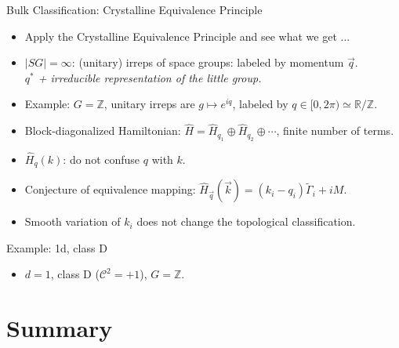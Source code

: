 \documentclass[xcolor=table, 11pt, aspectratio=169]{beamer}
\begin{document}
  \begin{frame}{Bulk Classification: Crystalline Equivalence Principle}
    \begin{itemize}
      \item<1-> Apply the Crystalline Equivalence Principle and see what we get ...
      \item<2-> $|SG|=\infty$: (unitary) irreps of space groups: labeled by momentum $\vec q$.\\
      \emph{$q^\ast$ + irreducible representation of the little group.}
      \item<3-> Example: $G=\mathbb Z$, unitary irreps are $g\mapsto e^{iq}$, labeled by $q\in [0,2\pi)\simeq\mathbb R/\mathbb Z$.
      \item<4-> Block-diagonalized Hamiltonian: $\hat H=\hat H_{q_1}\oplus\hat H_{q_2}\oplus\cdots$, \alert{finite} number of terms.
      \item<5-> $\hat H_q(k)$: do not confuse $q$ with $k$.
      \item<6-> Conjecture of equivalence mapping: $\hat H_{\vec q}(\vec k)=(k_i-q_i)\tilde\Gamma_i+iM$.
      \item<7-> Smooth variation of $k_i$ does not change the topological classification.
    \end{itemize}
    \begin{center}
    \begin{animateinline}{30}
      \multiframe{100}{Ra=1.5+-0.01}{
      \begin{tikzpicture}[scale=2]
          \draw [->] (0, 0) -- (2, 0) node [right] {$k$};
          \draw [blue] (\Ra-0.3, -0.5) -- (\Ra+0.3, 0.5);
          \draw [blue] (\Ra+0.3, -0.5) -- (\Ra-0.3, 0.5);
        \end{tikzpicture}
      }
    \end{animateinline}      
    \end{center}
  \end{frame}

  \begin{frame}{Example: 1d, class D}
    \begin{itemize}
      \item $d=1$, class D ($\mathcal C^2=+1$), $G=\mathbb Z$.
    \end{itemize}
  \end{frame}

  \section{Summary}
\end{document}
